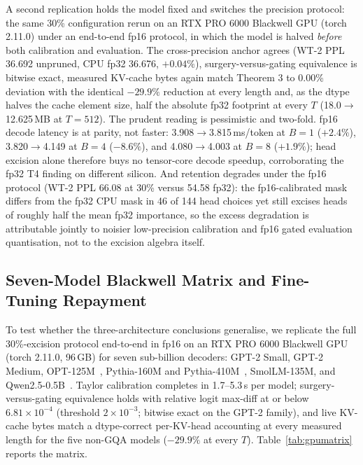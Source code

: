 \documentclass[11pt]{article}
\begin{document}
A second replication holds the model fixed and switches the precision protocol:
the same 30\% configuration rerun on an RTX PRO 6000 Blackwell GPU (torch 2.11.0)
under an end-to-end fp16 protocol, in which the model is halved \emph{before}
both calibration and evaluation. The cross-precision anchor agrees (WT-2 PPL
36.692 unpruned, CPU fp32 36.676, $+0.04\%$), surgery-versus-gating equivalence
is bitwise exact, measured KV-cache bytes again match Theorem 3 to 0.00\%
deviation with the identical $-29.9\%$ reduction at every length and, as the
dtype halves the cache element size, half the absolute fp32 footprint at every
$T$ (18.0$\to$12.625\,MB at $T{=}512$). The prudent reading is pessimistic and
two-fold. fp16 decode latency is at parity, not faster: 3.908$\to$3.815\,ms/token
at $B{=}1$ ($+2.4\%$), 3.820$\to$4.149 at $B{=}4$ ($-8.6\%$), and 4.080$\to$4.003
at $B{=}8$ ($+1.9\%$); head excision alone therefore buys no tensor-core decode
speedup, corroborating the fp32 T4 finding on different silicon. And retention
degrades under the fp16 protocol (WT-2 PPL 66.08 at 30\% versus 54.58 fp32):
the fp16-calibrated mask differs from the fp32 CPU mask in 46 of 144 head
choices yet still excises heads of roughly half the mean fp32 importance, so
the excess degradation is attributable jointly to noisier low-precision
calibration and fp16 gated evaluation quantisation, not to the excision algebra
itself.

\subsection{Seven-Model Blackwell Matrix and Fine-Tuning Repayment}
\label{sec:gpumatrix}
To test whether the three-architecture conclusions generalise, we replicate the
full 30\%-excision protocol end-to-end in fp16 on an RTX PRO 6000 Blackwell GPU
(torch 2.11.0, 96\,GB) for seven sub-billion decoders: GPT-2 Small, GPT-2
Medium, OPT-125M~\cite{zhang2022opt}, Pythia-160M and
Pythia-410M~\cite{biderman2023pythia}, SmolLM-135M, and
Qwen2.5-0.5B~\cite{qwen2025qwen25}. Taylor calibration completes in 1.7--5.3\,s
per model; surgery-versus-gating equivalence holds with relative logit max-diff
at or below $6.81\times10^{-4}$ (threshold $2\times10^{-3}$; bitwise exact on
the GPT-2 family), and live KV-cache bytes match a dtype-correct per-KV-head
accounting at every measured length for the five non-GQA models
($-29.9\%$ at every $T$).
Table~\ref{tab:gpumatrix} reports the matrix.
\end{document}
